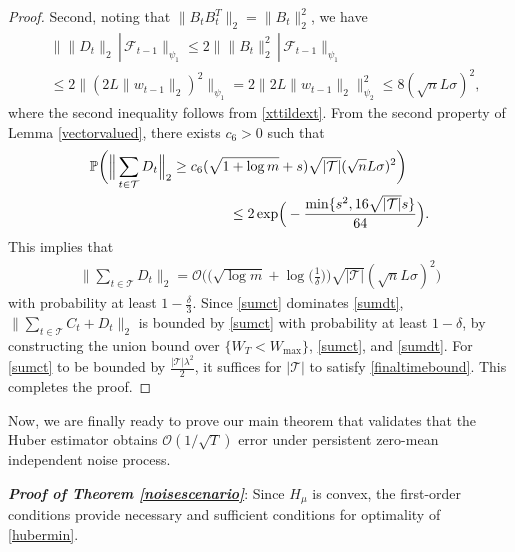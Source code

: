 \documentclass[letterpaper,10pt,conference]{ieeeconf}
\theoremstyle{plain} %
\theoremstyle{plain} %
\theoremstyle{plain} %
\theoremstyle{plain}
\begin{document}
\begin{proof}
  Second, noting that $\|B_t B_t^T\|_2 = \|B_t\|_2^2$, we have
  \begin{align*}
    &  \bigr\| \|D_t\|_2\,|\,\mathcal{F}_{t-1}  \bigr\|_{\psi_1}\le 2 \bigr\| \|B_t\|_2^2\,|\,\mathcal{F}_{t-1}  \bigr\|_{\psi_1}\\&\le 2 \bigr\| (2L\|w_{t-1}\|_2)^2  \bigr\|_{\psi_1}= 2 \bigr\| 2L\|w_{t-1}\|_2  \bigr\|_{\psi_2}^2\le 8(\sqrt{n}L\sigma)^2,
  \end{align*}
  where the second inequality follows from \eqref{xttildext}. From the second property of Lemma \ref{vectorvalued}, there exists $c_6>0$ such that
  \begin{align*}
    &  \mathbb{P}\biggr(  \Bigr\| \sum_{t\in\mathcal{T}} D_t  \Bigr\|_2 \ge c_6 (\sqrt{1+\log m} +s ) \sqrt{|\mathcal{T}|} (\sqrt{n}L\sigma)^2 \biggr)\\&\hspace{35mm}\le 2\exp\Bigr( -\frac{\min\{ s^2, 16\sqrt{|\mathcal{T}|}s\} }{64} \Bigr).
  \end{align*}
  This implies that 
  \begin{align}\label{sumdt}
      \Bigr\| \sum_{t\in\mathcal{T}} D_t  \Bigr\|_2 = \mathcal{O}\biggr( \Bigr( \sqrt{\log m}+  \log\Bigr(\frac{1}{\delta}\Bigr)  \Bigr) \sqrt{|\mathcal{T}|} (\sqrt{n}L \sigma)^2  \biggr)
  \end{align}
  with probability at least $1-\frac{\delta}{3}$. 
Since  \eqref{sumct} dominates \eqref{sumdt},  $\bigr\|  \sum_{t\in\mathcal{T}} C_t + D_t \bigr\|_2$ is bounded by  \eqref{sumct} with probability at least $1-\delta$, 
by constructing the union bound over $\{W_T<W_\text{max}\}$, \eqref{sumct}, and \eqref{sumdt}. 
For \eqref{sumct} to be bounded by $\frac{|\mathcal{T}|\lambda^2}{2}$, it suffices for $|\mathcal{T}|$ to satisfy \eqref{finaltimebound}.  This completes the proof.
\end{proof}


\medskip
Now, we are finally ready to prove our main theorem that validates that the Huber estimator obtains $\mathcal{O}(1/\sqrt{T})$ error under persistent zero-mean independent noise process. 

\textit{\textbf{Proof of Theorem \ref{noisescenario}}}:
   Since $H_\mu$ is convex, the first-order conditions provide necessary and sufficient conditions for optimality of \eqref{hubermin}. 
 
\end{document}
